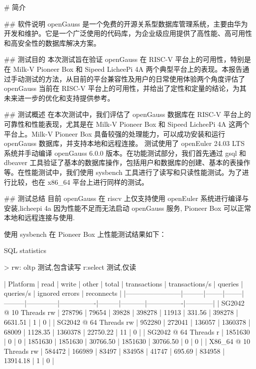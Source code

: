 \documentclass{article}
\begin{document}
\begin{markdown}
# 简介

## 软件说明
openGauss 是一个免费的开源关系型数据库管理系统，主要由华为开发和维护。它是一个广泛使用的代码库，为企业级应用提供了高性能、高可用性和高安全性的数据库解决方案。

## 测试目的
本次测试旨在验证 openGauss 在 RISC-V 平台上的可用性，特别是在 Milk-V Pioneer Box 和 Sipeed LicheePi 4A 两个典型平台上的表现。本报告通过手动测试的方法，从目前的平台兼容性及用户的日常使用体验两个角度评估了 openGauss 当前在 RISC-V 平台上的可用性，并给出了定性和定量的结论，为其未来进一步的优化和支持提供参考。

## 测试概述
在本次测试中，我们评估了 openGauss 数据库在 RISC-V 平台上的可靠性和性能表现，尤其是在 Milk-V Pioneer Box 和 Sipeed LicheePi 4A 这两个平台上。Milk-V Pioneer Box 具备较强的处理能力，可以成功安装和运行 openGauss 数据库，并支持本地和远程连接。
测试使用了 openEuler 24.03 LTS 系统并手动编译 openGauss 6.0.0 版本。在功能测试部分，我们首先通过 gsql 和 dbeaver 工具验证了基本的数据库操作，包括用户和数据库的创建、基本的表操作等。在性能测试中，我们使用 sysbench 工具进行了读写和只读性能测试。为了进行比较，也在 x86\_64 平台上进行同样的测试。


## 测试总结
目前 openGauss 在 riscv 上仅支持使用 openEuler 系统进行编译与安装,licheepi 4a 因为性能不足而无法启动 openGauss 服务,
Pioneer Box 可以正常本地和远程连接与使用.

使用 sysbench 在 Pioneer Box 上性能测试结果如下：

SQL statistics

> rw: oltp 测试,包含读写 r:select 测试,仅读

| Platform               | read    | write  | other  | total   | transactions | transactions/s | queries | queries/s | ignored errors | reconnects |
|------------------------|---------|--------|--------|---------|--------------|----------------|---------|-----------|----------------|------------|
| SG2042 @ 10 Threads rw | 278796  | 79654  | 39828  | 398278  | 11913        | 331.56         | 398278  | 6631.51   | 1              | 0          |
| SG2042 @ 64 Threads rw | 952280  | 272041 | 136057 | 1360378 | 68009        | 1128.35        | 1360378 | 22750.22  | 11             | 0          |
| SG2042 @ 64 Threads r  | 1851630 | 0      | 0      | 1851630 | 1851630      | 30766.50       | 1851630 | 30766.50  | 0              | 0          |
| X86_64 @ 10 Threads rw | 584472  | 166989 | 83497  | 834958  | 41747        | 695.69         | 834958  | 13914.18  | 1              | 0          |


\end{markdown}
\end{document}
